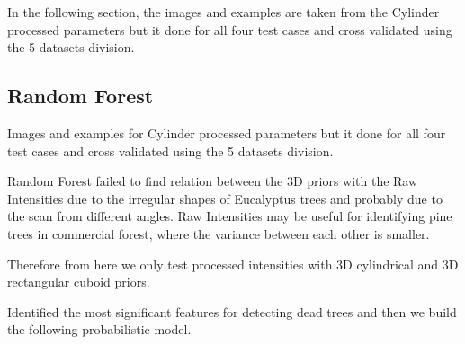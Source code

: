 \documentclass{subfiles}
\begin{document}
	\par In the following section, the images and examples are taken from the Cylinder processed parameters but it done for all four test cases and cross validated using the 5 datasets division.




\subsection{Random Forest}
	\par Images and examples for Cylinder processed parameters but it done for all four test cases and cross validated using the 5 datasets division.
	
	
	\par Random Forest failed to find relation between the 3D priors with the Raw Intensities due to the irregular shapes of Eucalyptus trees and probably due to the scan from different angles. Raw Intensities may be useful for identifying pine trees in commercial forest, where the variance between each other is smaller. 

	
	\par Therefore from here we only test processed intensities with 3D cylindrical and 3D  rectangular cuboid priors. 
	
	\par Identified the most significant features for detecting dead trees and then we build the following probabilistic model. 
	
\end{document}
